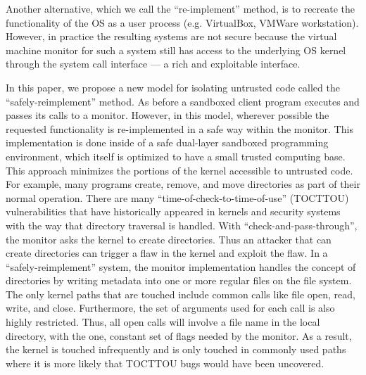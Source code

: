 \par
Another alternative, which we call the ``re-implement'' method, is to recreate the functionality of the OS as a user process (e.g. VirtualBox, VMWare workstation). However, in practice the resulting systems are not secure because the virtual machine monitor for such a system still has access to the underlying OS kernel through the system call interface --- a rich and exploitable interface.


\par
In this paper, we propose a new model for isolating untrusted code called the ``safely-reimplement'' method. As before a sandboxed client program executes and passes its calls to a monitor.  However, in this model, wherever possible the requested functionality is re-implemented in a safe way within the monitor. This implementation is done inside of a safe dual-layer sandboxed programming environment, which itself is optimized to have a small trusted computing base. This approach minimizes the portions of the kernel accessible to untrusted code. For example, many programs create, remove, and move directories as part of their normal operation. There are many ``time-of-check-to-time-of-use'' (TOCTTOU) vulnerabilities that have historically appeared in kernels and security systems with the way that directory traversal is handled. With ``check-and-pass-through'', the monitor asks the kernel to create directories. Thus an attacker that can create directories can trigger a flaw in the kernel and exploit the flaw. In a ``safely-reimplement'' system, the monitor implementation handles the concept of directories by writing metadata into one or more regular files on the file system. The only kernel paths that are touched include common calls like file open, read, write, and close. Furthermore, the set of arguments used for each call is also highly restricted. Thus, all open calls will involve a file name in the local directory, with the one, constant set of flags needed by the monitor. As a result, the kernel is touched infrequently and is only touched in commonly used paths where it is more likely that TOCTTOU bugs would have been uncovered.


